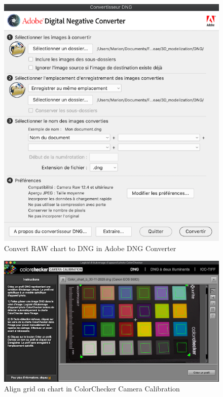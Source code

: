 \documentclass[
]{book}
\theoremstyle{definition}
\theoremstyle{definition}
\theoremstyle{definition}
\theoremstyle{definition}
\theoremstyle{remark}
\begin{document}
\begin{figure}
\hypertarget{adobe_dng}{%
\centering
\includegraphics[width=1\textwidth,height=\textheight]{Figures/AdobeDNGConverter.png}
\caption{Convert RAW chart to DNG in Adobe DNG
Converter}\label{adobe_dng}
}
\end{figure}

\begin{figure}
\hypertarget{color_checker_camera_calibration}{%
\centering
\includegraphics[width=1\textwidth,height=\textheight]{Figures/ColorChecker camera cailbration.png}
\caption{Align grid on chart in ColorChecker Camera
Calibration}\label{color_checker_camera_calibration}
}
\end{figure}
\end{document}
